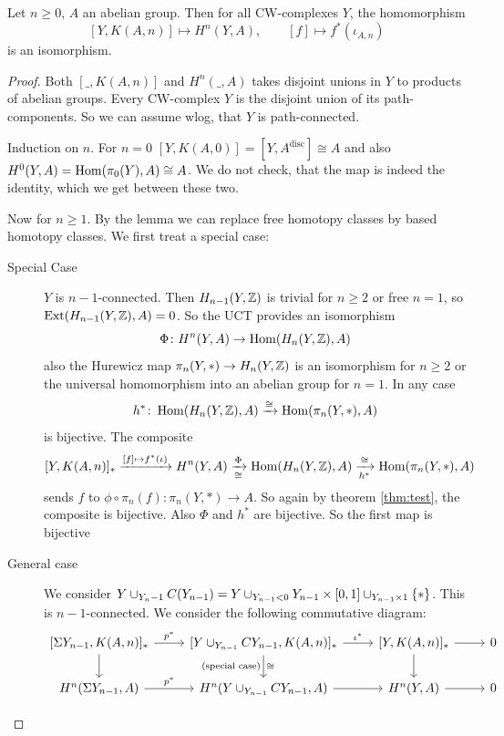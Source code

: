 \documentclass[language=english]{TemplateLecture}
\begin{document}
\begin{thm}{}{}
    Let \(n\geq 0\), \(A\) an abelian group. Then for all CW-complexes \(Y\), the homomorphism
    \[[Y, K(A,n)]\mapsto H^n(Y,A), \qquad [f]\mapsto f^*(\iota_{A,n})\]
    is an isomorphism.
\end{thm}

\begin{proof}
    Both \([\_, K(A,n)]\) and \(H^n(\_, A)\) takes disjoint unions in \(Y\) to products of abelian groups. Every CW-complex \(Y\) is the disjoint union of its path-components. So we can assume wlog, that \(Y\) is path-connected.

    Induction on \(n\). For \(n = 0\) \([Y, K(A,0)] = [Y, A^{\text{disc}}] \cong A\) and also \(H^0(Y,A) = \operatorname{Hom}(\pi_0(Y), A)\cong A\). We do not check, that the map is indeed the identity, which we get between these two.

    Now for \(n\geq 1\). By the lemma we can replace free homotopy classes by based homotopy classes. We first treat a special case:

    \begin{description}
        \item[Special Case] \(Y\) is \(n-1\)-connected. Then \(H_{n-1}(Y, \mathbb{Z})\) is trivial for \(n \geq 2\) or free \(n= 1\), so \(\mathrm{Ext}(H_{n-1}(Y,\mathbb{Z}), A) =0\). So the UCT provides an isomorphism
        \[\Phi\colon H^n(Y, A)\to \operatorname{Hom}(H_n(Y, \mathbb{Z}), A)\]
        also the Hurewicz map \(\pi_n(Y, *)\to H_n(Y, \mathbb{Z})\) is an isomorphism for \(n\geq 2\) or the universal homomorphism into an abelian group for \(n =1\). In any case
        \[h^*\colon \operatorname{Hom}(H_n(Y,\mathbb{Z}), A) \xrightarrow{\cong} \operatorname{Hom}(\pi_n(Y,*), A)\]
        is bijective. The composite
        \[[Y, K(A,n)]_* \xrightarrow{[f]\mapsto f^*(\iota)} H^n(Y,A) \xrightarrow[\cong]{\Phi} \operatorname{Hom}(H_n(Y, \mathbb{Z}), A) \xrightarrow[h^*]{\cong} \operatorname{Hom}(\pi_n(Y,*), A)\]
        sends \(f\) to \(\phi\circ \pi_n(f)\colon \pi_n(Y, *)\to A\). So again by theorem \ref{thm:test}, the composite is bijective. Also \(\Phi\) and \(h^*\) are bijective. So the first map is bijective
        \item[General case] We consider \(Y \cup_{Y_n-1} C(Y_{n-1}) = Y \cup_{Y_{n-1} < 0} Y_{n-1} \times [0,1] \cup_{Y_{n-1}\times 1} \{*\}\). This is \(n-1\)-connected.
        We consider the following commutative diagram:
        \[
        \begin{tikzcd}
            {[\Sigma Y_{n-1}, K(A,n)]_*} \ar[r, "p^*"] \ar[d] 
            & {[Y \cup_{Y_{n-1}} C Y_{n-1}, K(A,n)]_*}
                \ar[d, "\cong", "\text{(special case)}"'] 
                \ar[r, "\iota^*"] 
            & {[Y, K(A,n)]_*} \ar[d] \ar[r] & 0 \\
            H^n(\Sigma Y_{n-1}, A) \ar[r, "p^*"] 
            & H^n(Y \cup_{Y_{n-1}} C Y_{n-1}, A) \ar[r] 
            & H^n(Y, A) \ar[r] & 0
        \end{tikzcd}
        \]


\end{description}
\end{proof}
\end{document}
